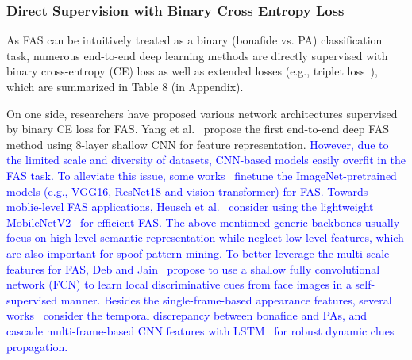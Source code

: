 \documentclass[10pt,journal,compsoc]{IEEEtran}
\begin{document}
\subsubsection{Direct Supervision with Binary Cross Entropy Loss}
As FAS can be intuitively treated as a binary (bonafide vs. PA) classification task, numerous end-to-end deep learning methods are directly supervised with binary cross-entropy (CE) loss as well as extended losses (e.g., triplet loss~\cite{hermans2017defense}), which are summarized in Table 8 (in Appendix). 

On one side, researchers have proposed various network architectures supervised by binary CE loss for FAS. Yang et al.~\cite{yang2014learn} propose the first end-to-end deep FAS method using 8-layer shallow CNN for feature representation. \textcolor{blue}{However, due to the limited scale and diversity of datasets, CNN-based models easily overfit in the FAS task. To alleviate this issue, some works~\cite{lucena2017transfer,chen2019attention,george2020effectiveness} finetune the ImageNet-pretrained models (e.g., VGG16, ResNet18 and  vision transformer) for FAS. Towards moblie-level FAS applications, Heusch et al.~\cite{heusch2020deep} consider using the lightweight MobileNetV2~\cite{sandler2018mobilenetv2} for efficient FAS. The above-mentioned generic backbones usually focus on high-level semantic representation while neglect low-level features, which are also important for spoof pattern mining. To better leverage the multi-scale features for FAS, Deb and Jain~\cite{deb2020look} propose to use a shallow fully convolutional network (FCN) to learn local discriminative cues from face images in a self-supervised manner. Besides the single-frame-based appearance features, several works~\cite{Xu2016Learning,muhammad2019face,yang2019face,ge2020face} consider the temporal discrepancy between bonafide and PAs, and cascade multi-frame-based CNN features with LSTM~\cite{hochreiter1997long} for robust dynamic clues propagation.}   
\end{document}
